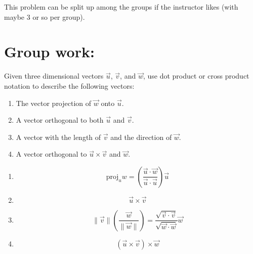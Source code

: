\documentclass[]{ximera}
\begin{document}
\begin{instructorNotes}
This problem can be split up among the groups if the instructor likes (with maybe 3 or so per group).  
\end{instructorNotes}







\section{Group work:}



\begin{problem}
Given three dimensional vectors $\vec{u}$, $\vec{v}$, and $\vec{w}$, use dot product or cross product notation to describe the following vectors:
	\begin{enumerate}
	\item  The vector projection of $\vec{w}$ onto $\vec{u}$.
	
	\item  A vector orthogonal to both $\vec{u}$ and $\vec{v}$.
	
	\item  A vector with the length of $\vec{v}$ and the direction of $\vec{w}$.  
	
	\item  A vector orthogonal to $\vec{u} \times \vec{v}$ and $\vec{w}$.
	\end{enumerate}
	
	\begin{freeResponse}
	\begin{enumerate}
	\item  
		\[
		\text{proj}_u w = \boxed{\left( \frac{\vec{u} \cdot \vec{w}}{\vec{u} \cdot \vec{u}} \right) \vec{u}}
		\]
	
	\item  
		\[
		\boxed{\vec{u} \times \vec{v}}
		\]
	
	\item  
		\[
		\| \vec{v} \| \left( \frac{\vec{w}}{\| \vec{w} \|} \right) = \boxed{ \frac{\sqrt{\vec{v} \cdot \vec{v}}}{\sqrt{\vec{w} \cdot \vec{w}}} \vec{w}}
		\]
	
	\item  
		\[
		\boxed{(\vec{u} \times \vec{v}) \times \vec{w}}
		\]
	\end{enumerate}
	\end{freeResponse}
	
\end{problem}
\end{document}
